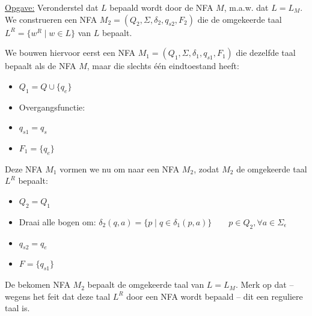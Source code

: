 \documentclass[../aanvullingen_cursus.tex]{subfiles}
\begin{document}
\underline{Opgave:}
Veronderstel dat \(L\) bepaald wordt door de NFA \(M\), m.a.w. dat \(L=L_M\). We construeren een NFA \(M_2=(Q_2,\Sigma,\delta_2,q_{s2},F_2)\) die de omgekeerde taal \(L^R=\{w^R \mid w \in L\}\) van \(L\) bepaalt.

We bouwen hiervoor eerst een NFA \(M_1=(Q_1,\Sigma,\delta_1,q_{s1},F_1)\) die dezelfde taal bepaalt als de NFA \(M\), maar die slechts één eindtoestand heeft:
\begin{itemize}
	\item \( Q_1=Q\cup\{q_e\} \)
	\item Overgangsfunctie: 
	\item \(q_{s1}=q_s\)
	\item \( F_1=\{q_e\} \)
\end{itemize}

Deze NFA \(M_1\) vormen we nu om naar een NFA \(M_2\), zodat \(M_2\) de omgekeerde taal \(L^R\) bepaalt:
\begin{itemize}
	\item \( Q_2=Q_1 \)
	\item Draai alle bogen om: \(\delta_2(q,a)=\{p \mid q \in \delta_1(p,a)\} \qquad p \in Q_2, \forall a \in \Sigma_\epsilon\)
	\item \(q_{s2}=q_e\)
	\item \(F=\{q_{s1}\}\)
\end{itemize}

De bekomen NFA \(M_2\) bepaalt de omgekeerde taal van \(L=L_M\). Merk op dat -- wegens het feit dat deze taal \(L^R\) door een NFA wordt bepaald -- dit een reguliere taal is.
\end{document}
